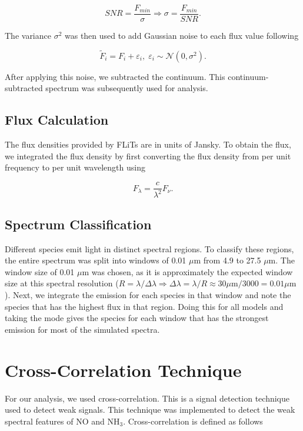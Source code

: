\documentclass[oneside, single, authoryear, semicolon, 12pt]{lion-msc}
\newcommand{\4}{$_4$}
\newcommand{\3}{$_3$}
\newcommand{\2}{$_2$}
\begin{document}
\begin{equation}
    SNR = \frac{F_{min}}{\sigma}\Rightarrow\sigma=\frac{F_{min}}{SNR}.
    \label{eq: SNR}
\end{equation}

The variance $\sigma^2$ was then used to add Gaussian noise to each flux value following 

\begin{equation}
    \tilde{F}_i = F_i + \varepsilon_i,\;\varepsilon_i\sim\mathcal{N}(0, \sigma^2).
    \label{eq: noise}
\end{equation}

After applying this noise, we subtracted the continuum. This continuum-subtracted spectrum was subsequently used for analysis.

\subsection{Flux Calculation}
The flux densities provided by FLiTs are in units of Jansky. To obtain the flux, we integrated the flux density by first converting the flux density from per unit frequency to per unit wavelength using

\begin{equation}
    F_\lambda=\frac{c}{\lambda^2}F_\nu.
    \label{eq: conversion}
\end{equation}

\subsection{Spectrum Classification}
Different species emit light in distinct spectral regions. To classify these regions, the entire spectrum was split into windows of 0.01 $\mu$m from 4.9 to 27.5 $\mu$m. The window size of 0.01 $\mu$m was chosen, as it is approximately the expected window size at this spectral resolution ($R=\lambda/\Delta\lambda\Rightarrow\Delta\lambda=\lambda/R\approx30 \mu \mathrm{m}/3000=0.01 \mu \mathrm{m}$). Next, we integrate the emission for each species in that window and note the species that has the highest flux in that region. Doing this for all models and taking the mode gives the species for each window that has the strongest emission for most of the simulated spectra.  


\section{Cross-Correlation Technique}
For our analysis, we used cross-correlation. This is a signal detection technique used to detect weak signals. This technique was implemented to detect the weak spectral features of NO and NH\3. Cross-correlation is defined as follows 
\end{document}
